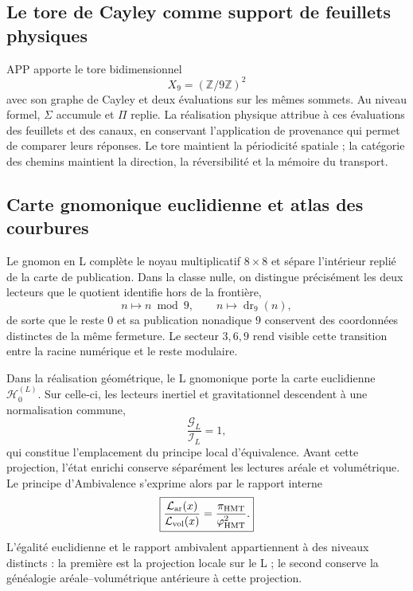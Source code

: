 \subsection{Le tore de Cayley comme support de feuillets physiques}

APP apporte le tore bidimensionnel
\[
 X_9=(\mathbb Z/9\mathbb Z)^2
\]
avec son graphe de Cayley et deux évaluations sur les mêmes sommets. Au
niveau formel, \(\Sigma\) accumule et \(\Pi\) replie. La réalisation physique
attribue à ces évaluations des feuillets et des canaux, en conservant l'application de
provenance qui permet de comparer leurs réponses. Le tore maintient la
périodicité spatiale ; la catégorie des chemins maintient la direction,
la réversibilité et la mémoire du transport.

\subsection{Carte gnomonique euclidienne et atlas des courbures}
\label{sec:carta-gnomonica-equivalencia-ads-ds}

Le gnomon en L complète le noyau multiplicatif \(8\times8\) et sépare
l'intérieur replié de la carte de publication. Dans
la classe nulle, on distingue précisément les deux lecteurs que le quotient
identifie hors de la frontière,
\[
 n\longmapsto n\bmod 9,
 \qquad
 n\longmapsto\operatorname{dr}_9(n),
\]
de sorte que le reste \(0\) et sa publication nonadique \(9\) conservent
des coordonnées distinctes de la même fermeture. Le secteur \(3,6,9\) rend visible
cette transition entre la racine numérique et le reste modulaire.

Dans la réalisation géométrique, le L gnomonique porte la carte euclidienne
\(\mathscr H_0^{(L)}\). Sur celle-ci, les lecteurs inertiel et gravitationnel
descendent à une normalisation commune,
\[
 \frac{\mathcal G_{L}}{\mathcal I_{L}}=1,
\]
qui constitue l'emplacement du principe local d'équivalence. Avant
cette projection, l'état enrichi conserve séparément les lectures
aréale et volumétrique. Le principe d'Ambivalence s'exprime alors par
le rapport interne
\[
 \boxed{
 \frac{\mathcal L_{\rm ar}(x)}{\mathcal L_{\rm vol}(x)}
 =\frac{\pi_{\rm HMT}}{\varphi_{\rm HMT}^{2}}.}
\]
L'égalité euclidienne et le rapport ambivalent appartiennent à des niveaux distincts :
la première est la projection locale sur le L ; le second conserve la
généalogie aréale--volumétrique antérieure à cette projection.

